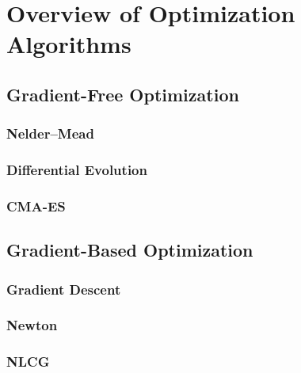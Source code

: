 \section{Overview of Optimization Algorithms}

\blindtext{}

\subsection{Gradient-Free Optimization}

\blindtext{}

\subsubsection{Nelder--Mead}

\blindtext{}

\subsubsection{Differential Evolution}

\blindtext{}

\subsubsection{CMA-ES}

\blindtext{}

\subsection{Gradient-Based Optimization}

\blindtext{}

\subsubsection{Gradient Descent}

\blindtext{}

\subsubsection{Newton}

\blindtext{}

\subsubsection{NLCG}

\blindtext{}
